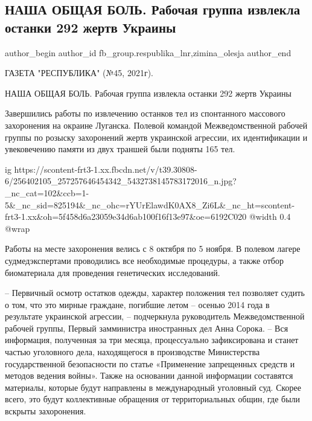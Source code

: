  
 
 
 
 
 
\subsection{НАША ОБЩАЯ БОЛЬ. Рабочая группа извлекла останки 292 жертв Украины}
\label{sec:11_11_2021.fb.fb_group.respublika_lnr.1.nasha_obschaja_bolj_ostanki}
 
\ifcmt
 author_begin
   author_id fb_group.respublika_lnr,zimina_olesja
 author_end
\fi

ГАЗЕТА "РЕСПУБЛИКА" (№45, 2021г).

НАША ОБЩАЯ БОЛЬ. Рабочая группа извлекла останки 292 жертв Украины

Завершились работы по извлечению останков тел из спонтанного массового
захоронения на окраине Луганска. Полевой командой Межведомственной рабочей
группы по розыску захоронений жертв украинской агрессии, их идентификации и
увековечению памяти из двух траншей были подняты 165 тел.

\ifcmt
  ig https://scontent-frt3-1.xx.fbcdn.net/v/t39.30808-6/256402105_257257646454342_5432738145783172016_n.jpg?_nc_cat=102&ccb=1-5&_nc_sid=825194&_nc_ohc=rYUrElawdK0AX8_Zi6L&_nc_ht=scontent-frt3-1.xx&oh=5f458d6a23059e34d6ab100f16f13e97&oe=6192C020
  @width 0.4
  @wrap 
\fi

Работы на месте захоронения велись с 8 октября по 5 ноября. В полевом лагере
судмедэкспертами проводились все необходимые процедуры, а также отбор
биоматериала для проведения генетических исследований. 

– Первичный осмотр остатков одежды, характер положения тел позволяет судить о
том, что это мирные граждане, погибшие летом – осенью 2014 года в результате
украинской агрессии, – подчеркнула руководитель Межведомственной рабочей
группы, Первый замминистра иностранных дел Анна Сорока. – Вся информация,
полученная за три месяца, процессуально зафиксирована и станет частью
уголовного дела, находящегося в производстве Министерства государственной
безопасности по статье «Применение запрещенных средств и методов ведения
войны». Также на основании данной информации составятся материалы, которые
будут направлены в международный уголовный суд. Скорее всего, это будут
коллективные обращения от территориальных общин, где были вскрыты захоронения. 


